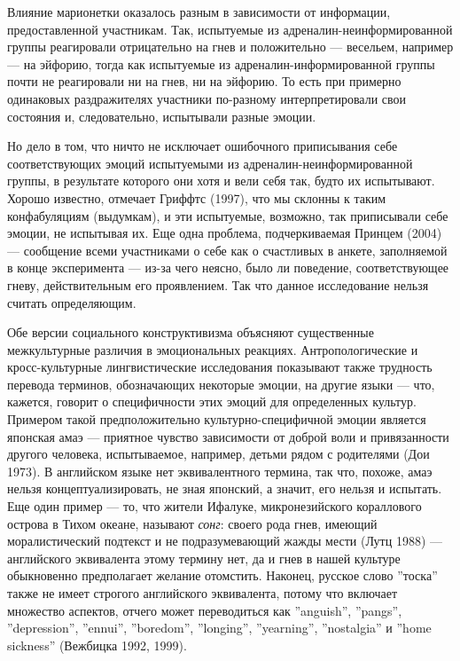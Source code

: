 \documentclass[11pt]{book}
\begin{document}
Влияние марионетки оказалось разным в зависимости от информации, предоставленной участникам. Так, испытуемые из адреналин-неинформированной группы реагировали отрицательно на гнев и положительно --- весельем, например --- на эйфорию, тогда как испытуемые из адреналин-информированной группы почти не реагировали ни на гнев, ни на эйфорию. То есть при примерно одинаковых раздражителях участники по-разному интерпретировали свои состояния и, следовательно, испытывали разные эмоции.

Но дело в том, что ничто не исключает ошибочного приписывания себе соответствующих эмоций испытуемыми из адреналин-неинформированной группы, в результате которого они хотя и вели себя так, будто их испытывают. Хорошо известно, отмечает Гриффтс (1997), что мы склонны к таким конфабуляциям (выдумкам), и эти испытуемые, возможно, так приписывали себе эмоции, не испытывая их. Еще одна проблема, подчеркиваемая Принцем (2004) --- сообщение всеми участниками о себе как о счастливых в анкете, заполняемой в конце эксперимента --- из-за чего неясно, было ли поведение, соответствующее гневу, действительным его проявлением. Так что данное исследование нельзя считать определяющим.

Обе версии социального конструктивизма объясняют существенные межкультурные различия в эмоциональных реакциях. Антропологические и кросс-культурные лингвистические исследования показывают также трудность перевода терминов, обозначающих некоторые эмоции, на другие языки --- что, кажется, говорит о специфичности этих эмоций для определенных культур. Примером такой предположительно культурно-специфичной эмоции является японская амаэ --- приятное чувство зависимости от доброй воли и привязанности другого человека, испытываемое, например, детьми рядом с родителями (Дои 1973). В английском языке нет эквивалентного термина, так что, похоже, амаэ нельзя концептуализировать, не зная японский, а значит, его нельзя и испытать. Еще один пример --- то, что жители Ифалуке, микронезийского кораллового острова в Тихом океане, называют \textit{сонг}: своего рода гнев, имеющий моралистический подтекст и не подразумевающий жажды мести (Лутц 1988) --- английского эквивалента этому термину нет, да и гнев в нашей культуре обыкновенно предполагает желание отомстить. Наконец, русское слово ''тоска'' также не имеет строгого английского эквивалента, потому что включает множество аспектов, отчего может переводиться как ''anguish'', ''pangs'', ''depression'', ''ennui'', ''boredom'', ''longing'', ''yearning'', ''nostalgia'' и ''home sickness'' (Вежбицка 1992, 1999).
\end{document}
